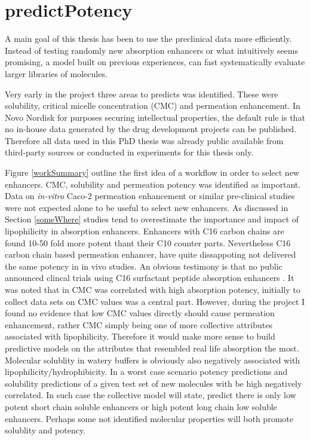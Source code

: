 \chapter{predictPotency}

A main goal of this thesis has been to use the preclinical data more efficiently. Instead of testing randomly new absorption enhancers or what intuitively seems promising, a model built on previous experiences, can fast systematically evaluate larger libraries of molecules.

Very early in the project three areas to predicts was identified. These were solubility, critical micelle concentration (CMC) and permeation enhancement. In Novo Nordisk for purposes securing intellectual properties, the default rule is that no in-house data generated by the drug development projects can be published. Therefore all data used in this PhD thesis was already public available from third-party sources or conducted in experiments for this thesis only. 

Figure \ref{workSummary} outline the first idea of a workflow in order to select new enhancers. CMC, solubility and permeation potency was identified as important. Data on \textit{in-vitro} Caco-2 permeation enhancement or similar pre-clinical studies were not expected alone to be useful to select new enhancers. As discussed in Section \ref{someWhere}  studies tend to overestimate the importance and impact of lipophilicity in absorption enhancers. Enhancers with C16 carbon chains are found 10-50 fold more potent thant their C10 counter parts. Nevertheless  C16 carbon chain based permeation enhancer, have quite dissappoting not delivered the same potency in in vivo studies. An obvious testimony is that no public announced clincal trials using C16 surfactant peptide absorption enhancers \cite{aguirre2016current}. It was noted that in CMC was correlated with high absorption potency, initially to collect data sets on CMC values was a central part. However, during the project I found no evidence that low CMC values directly should cause permeation enhancement, rather CMC simply being one of more collective attributes associated with lipophilicity. Therefore it would make more sense to build predictive models on the attributes that resembled real life absorption the most. Molecular solublity in watery buffers is obviously also negatively associated with lipophilicity/hydrophibicity. In a worst case scenario potency predictions and solubility predictions of a given test set of new molecules with be high negatively correlated. In such case the collective model will state, predict there is only low potent short chain soluble enhancers or high potent long chain low soluble enhancers. Perhaps some not identified molecular properties will both promote solublity and potency.

